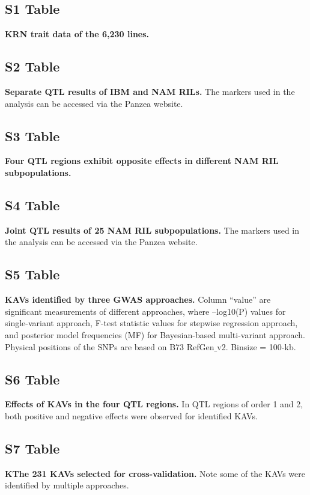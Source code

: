 \documentclass[10pt,letterpaper]{article}
\begin{document}
\subsection*{S1 Table}
\label{Table_S1}
{\bf KRN trait data of the 6,230 lines.}

\subsection*{S2 Table}
\label{Table_S2}
{\bf Separate QTL results of IBM and NAM RILs.} The markers used in the analysis can be accessed via the Panzea website.


\subsection*{S3 Table}
\label{Table_S3}
{\bf Four QTL regions exhibit opposite effects in different NAM RIL subpopulations.}

\subsection*{S4 Table}
\label{Table_S4}
{\bf Joint QTL results of 25 NAM RIL subpopulations.} The markers used in the analysis can be accessed via the Panzea website.

\subsection*{S5 Table}
\label{Table_S5}
{\bf KAVs identified by three GWAS approaches.} Column “value” are significant measurements of different approaches, where –log10(P) values for single-variant approach, F-test statistic values for stepwise regression approach, and posterior model frequencies (MF) for Bayesian-based multi-variant approach. Physical positions of the SNPs are based on B73 RefGen$\_$v2. Binsize  = 100-kb.

\subsection*{S6 Table}
\label{Table_S6}
{\bf Effects of KAVs in the four QTL regions.} In QTL regions of order 1 and 2, both positive and negative effects were observed for identified KAVs. 

\subsection*{S7 Table}
\label{Table_S7}
{\bf KThe 231 KAVs selected for cross-validation.} Note some of the KAVs were identified by multiple approaches. 
\end{document}
